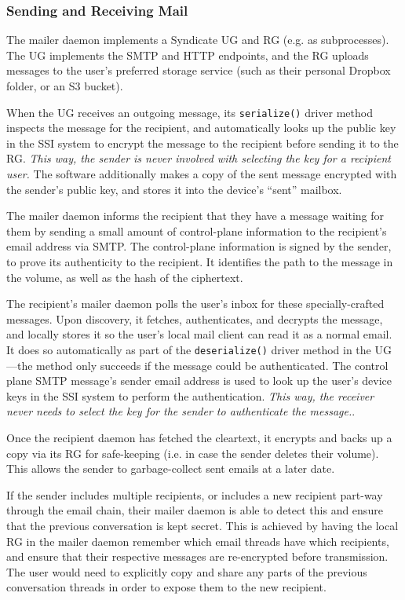 \subsubsection{Sending and Receiving Mail}

The mailer daemon implements a Syndicate UG and RG (e.g. as subprocesses).
The UG implements the SMTP
and HTTP endpoints, and the RG uploads messages to the user's preferred storage
service (such as their personal Dropbox folder, or an S3 bucket).

When the UG receives an outgoing message, its \texttt{serialize()} driver method inspects the
message for the recipient, and automatically looks up the public key in the SSI
system to encrypt the message to the recipient before sending it to the RG.
\emph{This way, the sender is never involved with selecting the key for a
recipient user.}  The software additionally makes a copy of the sent message encrypted with the
sender's public key, and stores it into the device's ``sent'' mailbox.

The mailer daemon informs the recipient that they have a message waiting for
them by sending a small amount of control-plane information to the recipient's
email address via SMTP.  The control-plane information is signed by the sender,
to prove its authenticity to the recipient.  It identifies the path to the
message in the volume, as well as the hash of the ciphertext.

The recipient's mailer daemon polls the user's inbox for these specially-crafted
messages.  Upon discovery, it fetches, authenticates, and decrypts the message,
and locally stores it so the user's local mail client can read it as a normal
email.  It does so automatically as part of the \texttt{deserialize()} driver
method in the UG---the method only succeeds if the message could be
authenticated.  The control plane SMTP message's sender email address
is used to look up the user's device keys in the SSI system to perform the authentication.
\emph{This way, the receiver never needs to select the key for the
sender to authenticate the message.}.

Once the recipient daemon has fetched the cleartext, it encrypts and backs up a
copy via its RG for safe-keeping (i.e. in case the sender deletes their volume).
This allows the sender to garbage-collect sent emails at a later date.

If the sender includes multiple recipients, or includes a new recipient part-way
through the email chain, their mailer daemon is able to detect this and ensure
that the previous conversation is kept secret.  This is achieved by having the
local RG in the mailer daemon remember which email threads have which recipients,
and ensure that their respective messages are re-encrypted before transmission.
The user would need to explicitly copy and share any parts of the previous
conversation threads in order to expose them to the new recipient.

